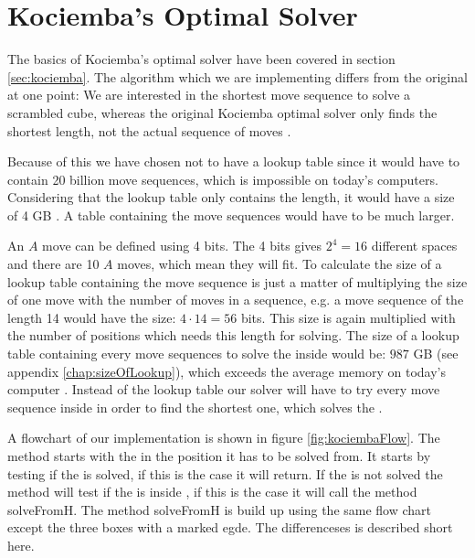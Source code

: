 \chapter{Kociemba's Optimal Solver}
\label{chap:kociembaImplement}
The basics of Kociemba's optimal solver have been covered in section \ref{sec:kociemba}. The algorithm which we are implementing differs from the original at one point:
We are interested in the shortest move sequence to solve a scrambled cube, whereas the original Kociemba optimal solver only finds the shortest length, not the actual sequence of moves \cite{rokicki09}.

Because of this we have chosen not to have a lookup table since it would have to contain 20 billion move sequences, which is impossible on today's computers. Considering that the lookup table only contains the length, it would have a size of 4 GB \cite{cubeExplorer}. A table containing the move sequences would have to be much larger.

An $A$ move can be defined using 4 bits.
The 4 bits gives $2^4=16$ different spaces and there are 10 $A$ moves, which mean they will fit.
To calculate the size of a lookup table containing the move sequence is just a matter of multiplying the size of one move with the number of moves in a sequence, e.g. a move sequence of the length 14 would have the size: $4 \cdot 14 = 56$ bits.
This size is again multiplied with the number of positions which needs this length for solving.
The size of a lookup table containing every move sequences to solve the \rubik{} inside  would be: $987$ GB (see appendix \ref{chap:sizeOfLookup}), which exceeds the average memory on today's computer \cite{averageRAM} \cite{maxRAM2}.
Instead of the lookup table our solver will have to try every move sequence inside  in order to find the shortest one, which solves the \rubik{}.

A flowchart of our implementation is shown in figure \ref{fig:kociembaFlow}.
The method starts with the \rubik{} in the position it has to be solved from.
It starts by testing if the \rubik{} is solved, if this is the case it will return.
If the \rubik{} is not solved the method will test if the \rubik{} is inside , if this is the case it will call the method solveFromH.
The method solveFromH is build up using the same flow chart except the three boxes with a marked egde.
The differenceses is described short here.

